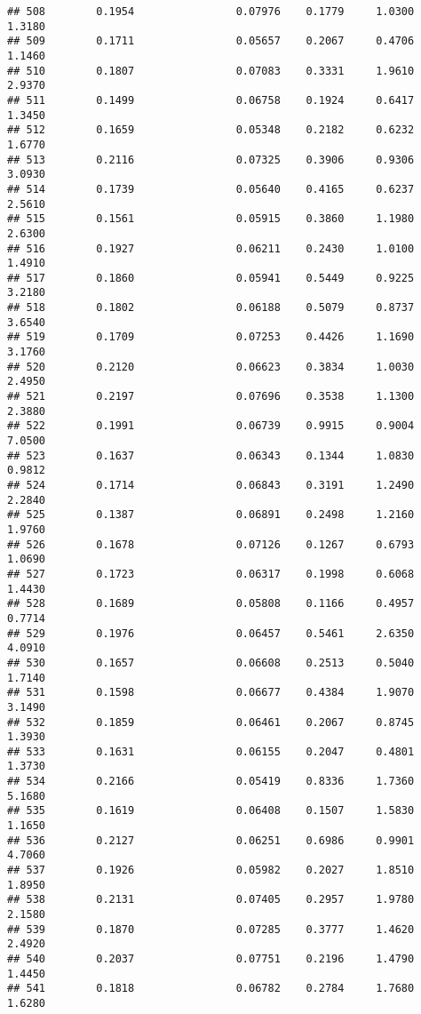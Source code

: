 \documentclass[
]{article}
\begin{document}
\begin{verbatim}
## 508        0.1954                0.07976    0.1779     1.0300       1.3180
## 509        0.1711                0.05657    0.2067     0.4706       1.1460
## 510        0.1807                0.07083    0.3331     1.9610       2.9370
## 511        0.1499                0.06758    0.1924     0.6417       1.3450
## 512        0.1659                0.05348    0.2182     0.6232       1.6770
## 513        0.2116                0.07325    0.3906     0.9306       3.0930
## 514        0.1739                0.05640    0.4165     0.6237       2.5610
## 515        0.1561                0.05915    0.3860     1.1980       2.6300
## 516        0.1927                0.06211    0.2430     1.0100       1.4910
## 517        0.1860                0.05941    0.5449     0.9225       3.2180
## 518        0.1802                0.06188    0.5079     0.8737       3.6540
## 519        0.1709                0.07253    0.4426     1.1690       3.1760
## 520        0.2120                0.06623    0.3834     1.0030       2.4950
## 521        0.2197                0.07696    0.3538     1.1300       2.3880
## 522        0.1991                0.06739    0.9915     0.9004       7.0500
## 523        0.1637                0.06343    0.1344     1.0830       0.9812
## 524        0.1714                0.06843    0.3191     1.2490       2.2840
## 525        0.1387                0.06891    0.2498     1.2160       1.9760
## 526        0.1678                0.07126    0.1267     0.6793       1.0690
## 527        0.1723                0.06317    0.1998     0.6068       1.4430
## 528        0.1689                0.05808    0.1166     0.4957       0.7714
## 529        0.1976                0.06457    0.5461     2.6350       4.0910
## 530        0.1657                0.06608    0.2513     0.5040       1.7140
## 531        0.1598                0.06677    0.4384     1.9070       3.1490
## 532        0.1859                0.06461    0.2067     0.8745       1.3930
## 533        0.1631                0.06155    0.2047     0.4801       1.3730
## 534        0.2166                0.05419    0.8336     1.7360       5.1680
## 535        0.1619                0.06408    0.1507     1.5830       1.1650
## 536        0.2127                0.06251    0.6986     0.9901       4.7060
## 537        0.1926                0.05982    0.2027     1.8510       1.8950
## 538        0.2131                0.07405    0.2957     1.9780       2.1580
## 539        0.1870                0.07285    0.3777     1.4620       2.4920
## 540        0.2037                0.07751    0.2196     1.4790       1.4450
## 541        0.1818                0.06782    0.2784     1.7680       1.6280

\end{verbatim}
\end{document}
